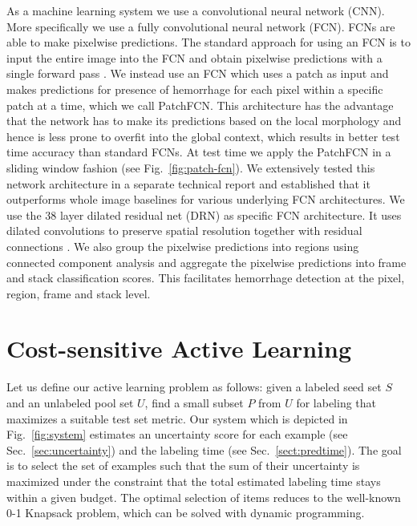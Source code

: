 \documentclass{llncs}
\begin{document}
As a machine learning system we use a convolutional neural network (CNN). More specifically we use a fully convolutional neural network (FCN). FCNs are able to make pixelwise predictions. The standard approach for using an FCN is to input the entire image into the FCN and obtain pixelwise predictions with a single forward pass \cite{long2015fully,yuhmukherjeemanley2015resource}. We instead use an FCN which uses a patch as input and makes predictions for presence of hemorrhage for each pixel within a specific patch at a time, which we call PatchFCN. This architecture has the advantage that the network has to make its predictions based on the local morphology and hence is less prone to overfit into the global context, which results in better test time accuracy than standard FCNs. At test time we apply the PatchFCN in a sliding window fashion (see Fig.~\ref{fig:patch-fcn}). We extensively tested this network architecture in a separate technical report \cite{arxiv2018PatchFCN} and established that it outperforms whole image baselines for various underlying FCN architectures. We use the 38 layer dilated residual net (DRN) as specific FCN architecture. It uses dilated convolutions to preserve spatial resolution together with residual connections \cite{yu2017dilated}. We also group the pixelwise predictions into regions using connected component analysis and aggregate the pixelwise predictions into frame and stack classification scores. This facilitates hemorrhage detection at the pixel, region, frame and stack level.


\vspace*{-0.2cm}
\section{Cost-sensitive Active Learning}
\vspace*{-0.2cm}

Let us define our active learning problem as follows: given a labeled seed set $S$ and an unlabeled pool set $U$, find a small subset $P$ from $U$ for labeling that maximizes a suitable test set metric. Our system which is depicted in Fig.~\ref{fig:system} estimates an uncertainty score for each example (see Sec.~\ref{sec:uncertainty}) and the labeling time (see Sec.~\ref{sect:predtime}). The goal is to select the set of examples such that the sum of their uncertainty is maximized under the constraint that the total estimated labeling time stays within a given budget. The optimal selection of items reduces to the well-known 0-1 Knapsack problem, which can be solved with dynamic programming.
\end{document}

